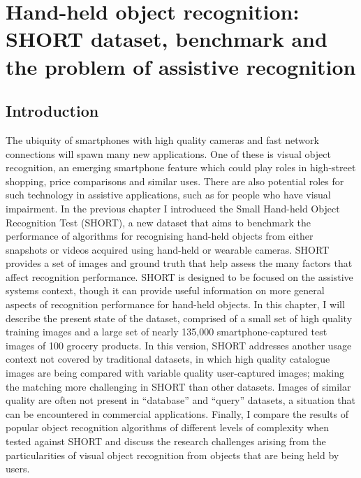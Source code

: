 \chapter{Hand-held object recognition: SHORT dataset, benchmark and the problem of assistive recognition}\label{ch:chapterSHORT}


\section{Introduction}
\label{sec:intro}

The ubiquity of smartphones with high quality cameras and fast network connections will spawn many new applications. One of these is visual object recognition, an emerging smartphone feature which could play roles in high-street shopping, price comparisons and similar uses. There are also potential roles for such technology in assistive applications, such as for people who have visual impairment. In the previous chapter I introduced the Small Hand-held Object Recognition Test (SHORT), a new dataset that aims to benchmark the performance of algorithms for recognising hand-held objects from either snapshots or videos acquired using hand-held or wearable cameras. SHORT provides a set of images and ground truth that help assess the many factors that affect recognition performance. SHORT is designed to be focused on the assistive systems context, though it can provide useful information on more general aspects of recognition performance for hand-held objects. In this chapter, I will describe the present state of the dataset, comprised of a small set of high quality training images and a large set of nearly 135,000 smartphone-captured test images of 100 grocery products. In this version, SHORT addresses another usage context not covered by traditional datasets, in which high quality catalogue images are being compared with variable quality user-captured images; making the matching more challenging in SHORT than other datasets. Images of similar quality are often not present in ``database'' and ``query'' datasets, a situation that can be encountered in commercial applications. Finally, I compare the results of popular object recognition algorithms of different levels of complexity when tested against SHORT and discuss the research challenges arising from the particularities of visual object recognition from objects that are being held by users.


